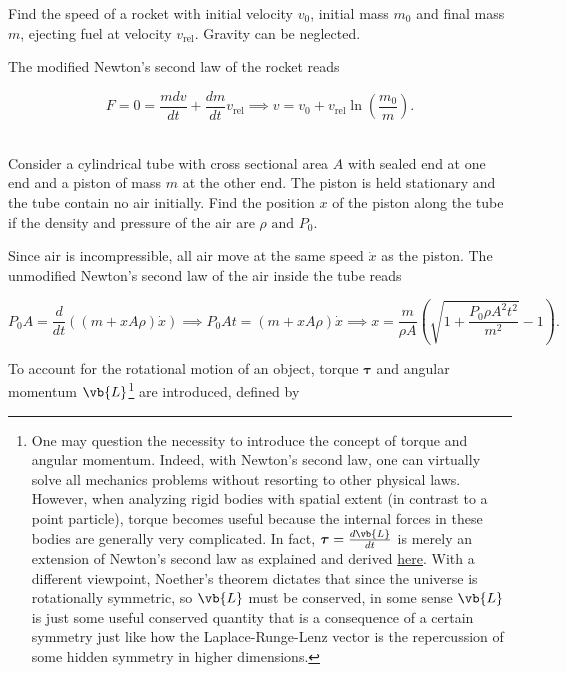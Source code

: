 \documentclass[a4paper,12pt]{report}
\begin{document}
{Find the speed of a rocket with initial velocity \(v_0 \), initial mass \(m_0 \) and final mass \(m \), ejecting fuel at velocity \(v_{\text{rel} } \). Gravity can be neglected. }
{The modified Newton's second law of the rocket reads

\begin{equation}
	F = 0 = \frac{mdv}{dt} + \frac{dm}{dt}v_{\text{rel} } \implies v = v_0 + v_{\text{rel} }  \ln \left( \frac{m_0 }{m }  \right).
\end{equation}~
} 

{Consider a cylindrical tube with cross sectional area \(A\) with sealed end at one end and a piston of mass \(m\) at the other end. The piston is held stationary and the tube contain no air initially. Find the position \(x\) of the piston along the tube if the density and pressure of the air are \(\rho \text { and } P_0 \).}
{Since air is incompressible, all air move at the same speed \(\dot{x} \) as the piston. The unmodified Newton's second law of the air inside the tube reads

\begin{equation}
	P_0 A = \frac{d}{dt}((m+xA\rho )\dot{x} ) \implies P_0 At = (m+xA\rho )\dot{x} \implies x = \frac{m}{\rho A}\left( \sqrt{1+\frac{P_0 \rho A^2t^2}{m^2} } -1 \right).  
\end{equation}
} 



To account for the rotational motion of an object, torque \(\boldsymbol{\tau } \) and angular momentum \(\vb{L} \)\footnote{One may question the necessity to introduce the concept of torque and angular momentum. Indeed, with Newton's second law, one can virtually solve all mechanics problems without resorting to other physical laws. However, when analyzing rigid bodies with spatial extent (in contrast to a point particle), torque becomes useful because the internal forces in these bodies are generally very complicated. In fact, \(\boldsymbol{\tau } = \frac{d \vb{L}}{dt} \) is merely an extension of Newton's second law as explained and derived \href{https://knzhou.github.io/handouts/M2Sol.pdf}{here}. With a different viewpoint, Noether's theorem dictates that since the universe is rotationally symmetric, so \(\vb{L} \) must be conserved, in some sense \(\vb{L}\) is just some useful conserved quantity that is a consequence of a certain symmetry just like how the Laplace-Runge-Lenz vector is the repercussion of some hidden symmetry in higher dimensions.} are introduced, defined by
\end{document}
